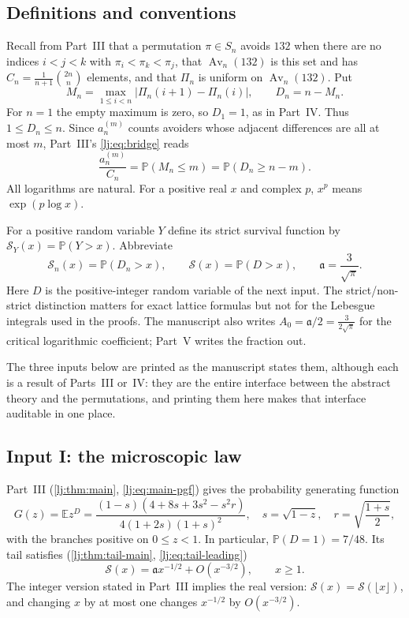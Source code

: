 \documentclass[11pt,a4paper]{article}
\theoremstyle{definition}\newaliascnt{definition}{theorem}
\theoremstyle{remark}\newaliascnt{remark}{theorem}
\newcommand{\Av}{\operatorname{Av}}
\newcommand{\ljP}{\mathbb P}
\newcommand{\ljE}{\mathbb E}
\begin{document}
\subsection{Definitions and conventions}
Recall from Part~III that a permutation $\pi\in S_n$ avoids $132$ when there
are no indices $i<j<k$ with $\pi_i<\pi_k<\pi_j$, that $\Av_n(132)$ is this
set and has $C_n=\frac1{n+1}\binom{2n}{n}$ elements, and that $\Pi_n$ is
uniform on $\Av_n(132)$. Put
\begin{equation}
 M_n=\max_{1\le i<n}|\Pi_n(i+1)-\Pi_n(i)|,
 \qquad D_n=n-M_n.
 \label{cjm:eq:statistic}
\end{equation}
For $n=1$ the empty maximum is zero, so $D_1=1$, as in Part~IV. Thus
$1\le D_n\le n$. Since $a_n^{(m)}$ counts avoiders whose adjacent
differences are all at most $m$, Part~III's \eqref{lj:eq:bridge} reads
\begin{equation}
 \frac{a_n^{(m)}}{C_n}=\ljP(M_n\le m)=\ljP(D_n\ge n-m).
 \label{cjm:eq:count-tail}
\end{equation}
All logarithms are natural. For a positive real $x$ and complex $p$, $x^p$
means $\exp(p\log x)$.

For a positive random variable $Y$ define its strict survival function by
$\mathcal S_Y(x)=\ljP(Y>x)$. Abbreviate
\[
 \mathcal S_n(x)=\ljP(D_n>x),\qquad \mathcal S(x)=\ljP(D>x),\qquad
 \mathfrak a=\frac{3}{\sqrt\pi}.
\]
Here $D$ is the positive-integer random variable of the next input. The
strict/non-strict distinction matters for exact lattice formulas but not
for the Lebesgue integrals used in the proofs. The manuscript also writes
$A_0=\mathfrak a/2=\frac3{2\sqrt\pi}$ for the critical logarithmic
coefficient; Part~V writes the fraction out.

The three inputs below are printed as the manuscript states them, although
each is a result of Parts~III or~IV: they are the entire interface between
the abstract theory and the permutations, and printing them here makes that
interface auditable in one place.

\subsection{Input I: the microscopic law}
Part~III (\cref{lj:thm:main}, \eqref{lj:eq:main-pgf}) gives the probability
generating function
\begin{equation}
 G(z)=\ljE z^D
 =\frac{(1-s)(4+8s+3s^2-s^2r)}{4(1+2s)(1+s)^2},
 \quad s=\sqrt{1-z},\quad r=\sqrt{\frac{1+s}{2}},
 \label{cjm:eq:pgf}
\end{equation}
with the branches positive on $0\le z<1$. In particular,
$\ljP(D=1)=7/48$. Its tail satisfies (\cref{lj:thm:tail-main},
\eqref{lj:eq:tail-leading})
\begin{equation}
 \mathcal S(x)=\mathfrak a x^{-1/2}+O(x^{-3/2}),\qquad x\ge1.
 \label{cjm:eq:limiting-tail}
\end{equation}
The integer version stated in Part~III implies the real version:
$\mathcal S(x)=\mathcal S(\lfloor x\rfloor)$, and changing $x$ by at most one
changes $x^{-1/2}$ by $O(x^{-3/2})$.
\end{document}
